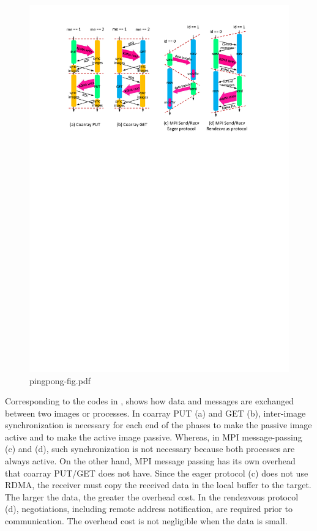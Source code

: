 \begin{figure}[bht]
  \begin{center}
    \mbox{\includegraphics[trim=30mm 195mm 32mm 16mm, scale=0.75,clip]{figs/pingpong-fig-r2.pdf}} 
    \caption{pingpong-fig.pdf}\label{fig:pingpong-fig}
  \end{center}
\end{figure}

Corresponding to the codes in ,  shows how data and 
messages are exchanged between two images or processes.
In coarray PUT (a) and GET (b), inter-image synchronization is necessary for each end of 
the phases to make the passive image active and to make the active image passive.
Whereas, in MPI message-passing (c) and (d), such synchronization is not necessary because
both processes are always active.
%
On the other hand, MPI message passing has its own overhead that coarray PUT/GET
does not have. Since the eager protocol (c) does not use RDMA, the receiver
must copy the received data in the local buffer to the target. The larger the data,
the greater the overhead cost.
In the rendezvous protocol (d), negotiations, including remote address notification,
are required prior to communication.
The overhead cost is not negligible when the data is small.


